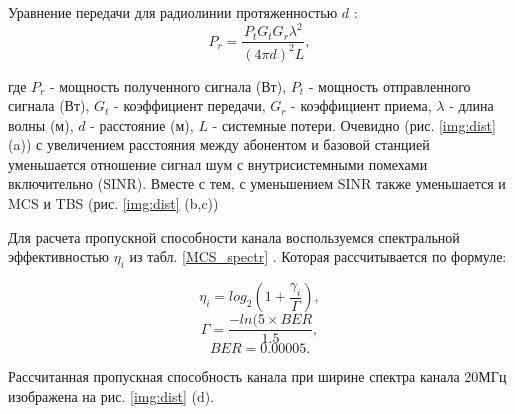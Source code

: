 Уравнение передачи для радиолинии протяженностью $d$ \cite{Friis}:
\begin{equation}\label{eq:friisNew}
P_{r}=\frac{P_{t}G_{t}G_{r}\lambda^{2}}{(4\pi d)^{2}L},
\end{equation}

\noindent где $P_{r}$ - мощность полученного сигнала (Вт), $P_{t}$ - мощность отправленного сигнала (Вт), $G_{t}$ - коэффициент передачи, $G_{r}$ - коэффициент приема, $\lambda$ - длина волны (м), $d$ - расстояние (м), $L$ - системные потери. Очевидно (рис. \ref{img:dist} (a)) с увеличением расстояния между абонентом и базовой станцией уменьшается отношение сигнал шум с внутрисистемными помехами включительно (SINR). Вместе с тем, с уменьшением SINR также уменьшается и MCS и TBS (рис. \ref{img:dist} (b,c))

Для расчета пропускной способности канала воспользуемся спектральной эффективностью $\eta_{i}$ из табл. \ref{MCS_spectr}  \cite{R1-081483}. Которая рассчитывается по формуле:

\begin{equation}\label{eq:spectr1}
\eta_{i}=log_{2}(1+\frac{\gamma_{i}}{\Gamma}),
\end{equation}
\begin{equation}\label{eq:spectr2}
\Gamma=\frac{-ln(5\times BER}{1.5},
\end{equation}
\begin{equation}\label{eq:spectr3}
BER=0.00005.
\end{equation}

Рассчитанная пропускная способность канала при ширине спектра канала  20МГц изображена на рис. \ref{img:dist} (d).

\clearpage



